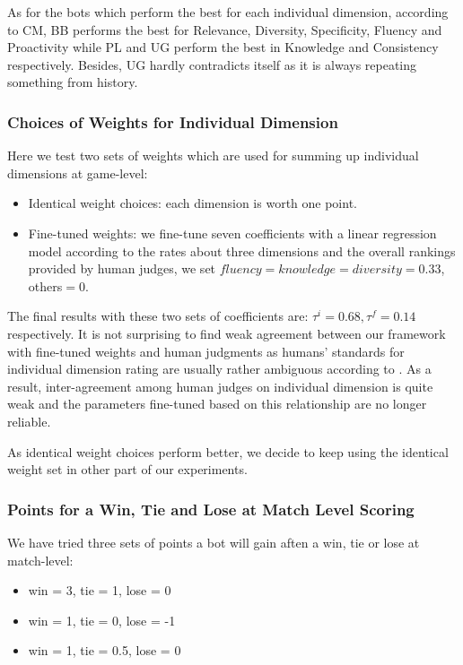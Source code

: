 As for the bots which perform the best for each individual dimension,
 according to CM, BB performs the best for Relevance, Diversity, Specificity, Fluency and Proactivity while PL and UG perform the best in Knowledge and Consistency respectively. Besides, UG hardly contradicts itself as it is always repeating something from history.  
\subsubsection*{Choices of Weights for Individual Dimension}

Here we test two sets of weights which are used for summing up individual dimensions at game-level:
\begin{itemize}
\item Identical weight choices: each dimension is worth one point.
\item Fine-tuned weights: we fine-tune seven coefficients with a linear regression model
 according to the rates about three dimensions 
and the overall rankings provided by human judges, we set $fluency = knowledge = diversity = 0.33$, others$=0$.
\end{itemize}

 The final results with these two sets of coefficients are: 
$\tau^i = 0.68, \tau^f = 0.14 $ respectively. 
It is not surprising to find weak agreement between our framework with fine-tuned weights and human judgments as 
humans' standards for individual dimension rating are usually rather ambiguous according to . As a result, inter-agreement among human judges on individual dimension is quite weak and the parameters fine-tuned based on this relationship are no longer reliable.

 As identical weight choices perform better, we decide to keep using the identical weight set in other part of our experiments.  
 
\subsubsection*{Points for a Win, Tie and Lose at Match Level Scoring}
We have tried three sets of points a bot will gain aften a win, tie or lose at match-level:
\begin{itemize}
\item win = 3, tie = 1, lose = 0
\item win = 1, tie = 0, lose = -1
\item win = 1, tie = 0.5, lose = 0
\end{itemize}

